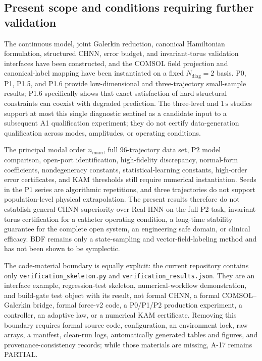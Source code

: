 \subsection{Present scope and conditions requiring further validation}\label{sec:discussion-7-2}

The continuous model, joint Galerkin reduction, canonical Hamiltonian formulation, structured CHNN, error budget, and invariant-torus validation interfaces have been constructed, and the COMSOL field projection and canonical-label mapping have been instantiated on a fixed \(N_{\mathrm{diag}}=2\) basis. P0, P1, P1.5, and P1.6 provide low-dimensional and three-trajectory small-sample results; P1.6 specifically shows that exact satisfaction of hard structural constraints can coexist with degraded prediction. The three-level and \(1\,\mathrm{s}\) studies support at most this single diagnostic sentinel as a candidate input to a subsequent A1 qualification experiment; they do not certify data-generation qualification across modes, amplitudes, or operating conditions.

The principal modal order \(n_{\mathrm{main}}\), full 96-trajectory data set, P2 model comparison, open-port identification, high-fidelity discrepancy, normal-form coefficients, nondegeneracy constants, statistical-learning constants, high-order error certificates, and KAM thresholds still require numerical instantiation. Seeds in the P1 series are algorithmic repetitions, and three trajectories do not support population-level physical extrapolation. The present results therefore do not establish general CHNN superiority over Real HNN on the full P2 task, invariant-torus certification for a catheter operating condition, a long-time stability guarantee for the complete open system, an engineering safe domain, or clinical efficacy. BDF remains only a state-sampling and vector-field-labeling method and has not been shown to be symplectic.

The code-material boundary is equally explicit: the current repository contains only \texttt{verification\_skeleton.py} and \texttt{verification\_results.json}. They are an interface example, regression-test skeleton, numerical-workflow demonstration, and build-gate test object with its result, not formal CHNN, a formal COMSOL--Galerkin bridge, formal force-v2 code, a P0/P1/P2 production experiment, a controller, an adaptive law, or a numerical KAM certificate. Removing this boundary requires formal source code, configuration, an environment lock, raw arrays, a manifest, clean-run logs, automatically generated tables and figures, and provenance-consistency records; while those materials are missing, A-17 remains PARTIAL.

